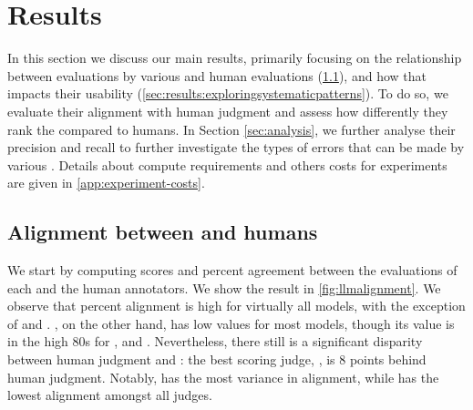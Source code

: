 \section{Results} \label{sec:results}

In this section we discuss our main results, primarily focusing on the relationship between evaluations by various \judgemodels and human evaluations (\cref{sec:results:exploringhumanjudgellmalignment}), and how that impacts their usability (\cref{sec:results:exploringsystematicpatterns}).
To do so, we evaluate their alignment with human judgment and assess how differently they rank the \nexamtakersword \evaluatormodels compared to humans.
In Section \ref{sec:analysis}, we further analyse their precision and recall to further investigate the types of errors that can be made by various \judgemodels. Details about compute requirements and others costs for experiments are given in \cref{app:experiment-costs}.

\subsection{Alignment between \judgemodels and humans}
\label{sec:results:exploringhumanjudgellmalignment}

We start by computing \scottspi scores and percent agreement between the evaluations of each \judgemodel and the human annotators. %
We show the result in \cref{fig:llmalignment}.
We observe that percent alignment is high for virtually all models, with the exception of  and .
\scottspi, on the other hand, has low values for most models, though its value is in the high 80s for ,   and \judge{\gpt}. %
Nevertheless, there still is a significant disparity between human judgment and \judgemodels: the best scoring judge, , is 8 points behind human judgment. 
Notably,  has the most variance in alignment, while  has the lowest alignment amongst all judges.

